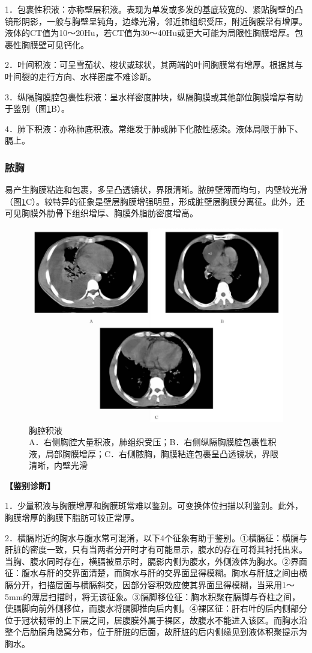 1．包裹性积液：亦称壁层积液。表现为单发或多发的基底较宽的、紧贴胸壁的凸镜形阴影，一般与胸壁呈钝角，边缘光滑，邻近肺组织受压，附近胸膜常有增厚。液体的CT值为10～20Hu，若CT值为30～40Hu或更大可能为局限性胸膜增厚。包裹性胸膜壁可见钙化。

2．叶间积液：可呈雪茄状、梭状或球状，其两端的叶间胸膜常有增厚。根据其与叶间裂的走行方向、水样密度不难诊断。

3．纵隔胸膜腔包裹性积液：呈水样密度肿块，纵隔胸膜或其他部位胸膜增厚有助于鉴别（图\ref{fig9-43}B）。

4．肺下积液：亦称肺底积液。常继发于肺或肺下化脓性感染。液体局限于肺下、膈上。

\subsubsection{脓胸}

易产生胸膜粘连和包裹，多呈凸透镜状，界限清晰。脓肿壁薄而均匀，内壁较光滑（图\ref{fig9-43}C）。较特异的征象是壁层胸膜增强明显，形成脏壁层胸膜分离征。此外，还可见胸膜外肋骨下组织增厚、胸膜外脂肪密度增高。

\begin{figure}[!htbp]
 \centering
 \includegraphics[width=.7\textwidth,height=\textheight,keepaspectratio]{./images/Image00241.jpg}
 \captionsetup{justification=centering}
 \caption{胸腔积液\\{\small A．右侧胸腔大量积液，肺组织受压；B．右侧纵隔胸膜腔包裹性积液，局部胸膜增厚；C．右侧脓胸，胸膜粘连包裹呈凸透镜状，界限清晰，内壁光滑}}
 \label{fig9-43}
  \end{figure} 

\textbf{【鉴别诊断】}

1．少量积液与胸膜增厚和胸膜斑常难以鉴别。可变换体位扫描以利鉴别。此外，胸膜增厚的胸膜下脂肪可较正常厚。

2．横膈附近的胸水与腹水常可混淆，以下4个征象有助于鉴别。①横膈征：横膈与肝脏的密度一致，只有当两者分开时才有可能显示，腹水的存在可将其衬托出来。当胸、腹水同时存在，横膈被显示时，膈影内侧为腹水，外侧液体为胸水。②界面征：腹水与肝的交界面清楚，而胸水与肝的交界面显得模糊。胸水与肝脏之间由横膈分开，扫描层面与横膈斜交，因部分容积效应使其界面显得模糊，当采用1～5mm的薄层扫描时，将无该征象。③膈脚移位征：胸水积聚在膈脚与脊柱之间，使膈脚向前外侧移位，而腹水将膈脚推向后内侧。④裸区征：肝右叶的后内侧部分位于冠状韧带的上下层之间，居腹膜外属于裸区，故腹水不能进入该区。而胸水沿整个后肋膈角隐窝分布，位于肝脏的后面，故肝脏的后内侧缘见到液体积聚提示为胸水。


